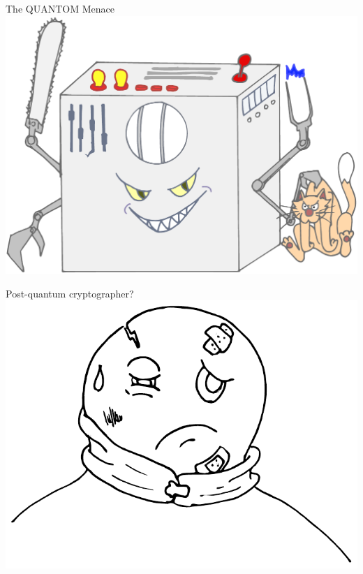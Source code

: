 \documentclass{beamer}
\begin{document}

\begin{frame}{The QUANTOM Menace}
  \centering
  \includegraphics[height=0.7\textheight]{qc-color}
\end{frame}


\begin{frame}{Post-quantum cryptographer?}
  \centering
  \includegraphics[height=0.7\textheight]{ec-broke}
\end{frame}

\end{document}
